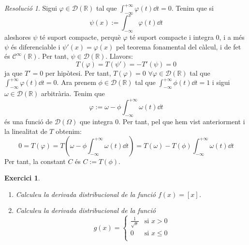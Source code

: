 \documentclass[10pt,a4paper]{article}
\newcommand{\RR}{\ensuremath{\mathbb{R}}} %
\newtheorem{exercici}{Exercici}
\theoremstyle{definition}
\theoremstyle{remark}
\newtheorem*{res}{Resolució}
\begin{document}
\begin{res}
  Sigui $\varphi\in \mathcal{D}(\RR)$ tal que $\int_{-\infty}^{+\infty} \varphi(t)\dd{t}=0$. Tenim que si
  $$
    \psi(x):=\int_{-\infty}^x \varphi(t)\dd{t}
  $$
  aleshores $\psi$ té suport compacte, perquè $\varphi$ té suport compacte i integra 0, i a més $\psi$ és diferenciable i $\psi'(x)=\varphi(x)$ pel teorema fonamental del càlcul, i de fet és $\mathcal{C}^\infty(\RR)$. Per tant, $\psi\in\mathcal{D}(\RR)$. Llavors:
  $$
    T(\varphi)=T(\psi')=-T'(\psi)=0
  $$
  ja que $T'=0$ per hipòtesi. Per tant, $T(\varphi)=0$ $\forall \varphi\in\mathcal{D}(\RR)$ tal que $\int_{-\infty}^{+\infty} \varphi(t)\dd{t}=0$. Ara prenem $\phi\in \mathcal{D}(\RR)$ tal que $\int_{-\infty}^{+\infty} \phi(t)\dd{t}=1$ i sigui $\omega\in \mathcal{D}(\RR)$ arbitrària. Tenim que
  $$
    \varphi:=\omega-\phi\int_{-\infty}^{+\infty} \omega(t)\dd{t}
  $$
  és una funció de $\mathcal{D}(\Omega)$ que integra 0. Per tant, pel que hem vist anteriorment i la linealitat de $T$ obtenim:
  $$
    0=T(\varphi)=T\left(\omega-\phi\int_{-\infty}^{+\infty} \omega(t)\dd{t}\right)=T(\omega)-T(\phi)\int_{-\infty}^{+\infty} \omega(t)\dd{t}
  $$
  Per tant, la constant $C$ és $C:= T(\phi)$.
\end{res}
\begin{exercici}\hfill
  \begin{enumerate}
    \item Calculeu la derivada distribucional de la funció $f(x)=[x]$.
    \item Calculeu la derivada distribucional de la funció $$
            g(x)=\begin{cases}
              \frac{1}{\sqrt{x}} & \text{si } x>0     \\
              0                  & \text{si } x\leq 0 \\
            \end{cases}
          $$
  \end{enumerate}
\end{exercici}
\end{document}
